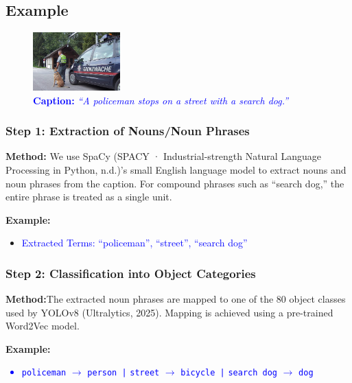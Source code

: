\documentclass[11pt,letterpaper]{article}
\begin{document}
\subsection*{Example}
\noindent
   \begin{figure}[h]
    \centering
    \includegraphics[width=0.3\textwidth]{midterm_report/assets/oriIMG.jpg}
    \caption{\textcolor{blue}{\textbf{Caption:} \emph{``A policeman stops on a street with a search dog.''}}}
    \label{fig:original_image}
\end{figure}
\subsubsection*{Step 1: Extraction of Nouns/Noun Phrases}

\textbf{Method:} We use SpaCy\cite{spacy2025} (SPACY · Industrial-strength Natural Language Processing in Python, n.d.)'s small English language model to extract nouns and noun phrases from the caption. For compound phrases such as ``search dog,'' the entire phrase is treated as a single unit.

\noindent
\textbf{Example:}
\begin{itemize}
  \item \textcolor{blue}{ Extracted Terms: ``policeman'', ``street'', ``search dog''}
\end{itemize}


\subsubsection*{Step 2: Classification into Object Categories}

\textbf{Method:}The extracted noun phrases are mapped to one of the 80 object classes used by YOLOv8\cite{ultralytics2023segment} (Ultralytics, 2025). Mapping is achieved using a pre-trained Word2Vec model.


\noindent
\textbf{Example:}
\textcolor{blue}{\begin{itemize}
  \item \texttt{policeman} $\to$ \texttt{person |}
  \texttt{street} $\to$ \texttt{bicycle |}
  \texttt{search dog} $\to$ \texttt{dog}
\end{itemize}}
\end{document}
